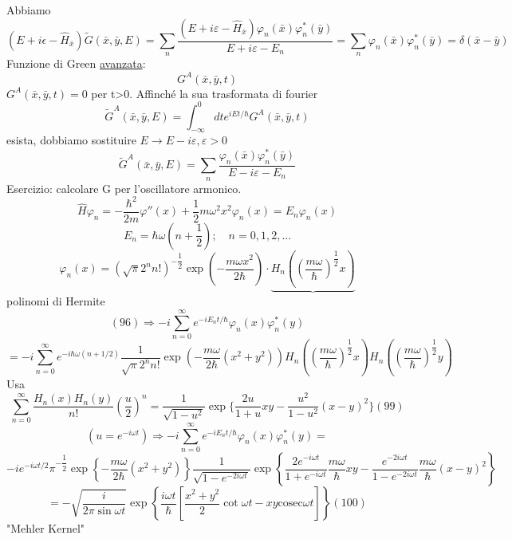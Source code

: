 \documentclass[a4paper,11pt]{report}
\newcommand{\x}{\bar{x}}
\newcommand{\y}{\bar{y}}
\begin{document}
Abbiamo 
\begin{equation}
(E + i\epsilon - \hat{H}_{\x})\tilde{G}(\x,\y,E)=\sum_n \dfrac{(E + i\varepsilon - \hat{H}_{\x}) \varphi_n(\x)\varphi_n^*(\y)}{E + i\varepsilon - E_n} = \sum_n \varphi_n(\x)\varphi_n^*(\y)=\delta(\x-\y)
\end{equation}
Funzione di Green \underline{avanzata}: 
$$
G^A(\x,\y,t)
$$
$G^A(\x,\y,t)=0$ per t>0. Affinché la sua trasformata di fourier
$$
\tilde{G}^A(\x,\y,E)=\int_{-\infty}^0 dt e^{iEt/\hbar}G^A(\x,\y,t)
$$
esista, dobbiamo sostituire $E\to E-i\varepsilon, \varepsilon >0$
$$
\tilde{G}^A(\x,\y,E)=\sum_n \dfrac{\varphi_n(\x)\varphi_n^*(\y)}{E - i\varepsilon - E_n}
$$
Esercizio: calcolare G per l'oscillatore armonico.
$$
\hat{H}\varphi_n = -\dfrac{\hbar^2}{2m}\varphi''(x) + \dfrac{1}{2}m\omega^2 x^2 \varphi_n(x)=E_n\varphi_n(x)
$$
$$
E_n=\hbar\omega\left(n+\dfrac{1}{2}\right);\quad n=0,1,2,\dots 
$$
$$
\varphi_n(x)=(\sqrt{\pi}2^n n!)^{-\dfrac{1}{2}}\exp\left(-\dfrac{m\omega x^2}{2\hbar}\right)\cdot\underbrace{H_n\left(\left(\dfrac{m\omega}{\hbar}\right)^{\dfrac{1}{2}}x\right)}
$$
polinomi di Hermite
$$
(96)\Rightarrow -i\sum_{n=0}^\infty e^{-iE_n t/\hbar}\varphi_n(x)\varphi_n^*(y)
$$
$$
=-i\sum_{n=0}^\infty e^{-i\hbar\omega(n+1/2)} \dfrac{1}{\sqrt{\pi} 2^n n!} \exp\left(-\dfrac{m\omega}{2\hbar}(x^2+y^2)\right) H_n\left(\left(\dfrac{m\omega}{\hbar}\right)^{\dfrac{1}{2}}x\right)H_n\left(\left(\dfrac{m\omega}{\hbar}\right)^{\dfrac{1}{2}}y\right)
$$
Usa 
\begin{equation}
\sum_{n=0}^\infty \dfrac{H_n (x)H_n (y)}{n!} \left(\dfrac{u}{2}\right)^n=\dfrac{1}{\sqrt{1-u^2}}\exp\{\dfrac{2u}{1+u}xy - \dfrac{u^2}{1-u^2}(x-y)^2\}(99)
\end{equation}
$$
(u=e^{-i\omega t}) \Rightarrow -i\sum_{n=0}^\infty e^{-iE_n t/\hbar} \varphi_n(x)\varphi_n^*(y) = 
$$
$$
-i e^{-i\omega t/2}\pi^{-\dfrac{1}{2}}\exp\left\{-\dfrac{m\omega}{2\hbar}(x^2+y^2)\right\}\dfrac{1}{\sqrt{1-e^{-2i\omega t}}}\exp\left\{\dfrac{2e^{-i\omega t}}{1+e^{-i\omega t}} \dfrac{m\omega}{\hbar}xy - \dfrac{e^{-2i\omega t}}{1-e^{-2i\omega t}}\dfrac{m\omega}{\hbar}(x-y)^2\right\}
$$
\begin{equation}
=-\sqrt{\dfrac{i}{2\pi\sin \omega t}}\exp\left\{ \dfrac{i\omega t}{\hbar}\left[\dfrac{x^2+y^2}{2}\cot \omega t - xy \mathrm{cosec} \omega t\right]\right\}(100)
\end{equation}
"Mehler Kernel"
\end{document}
